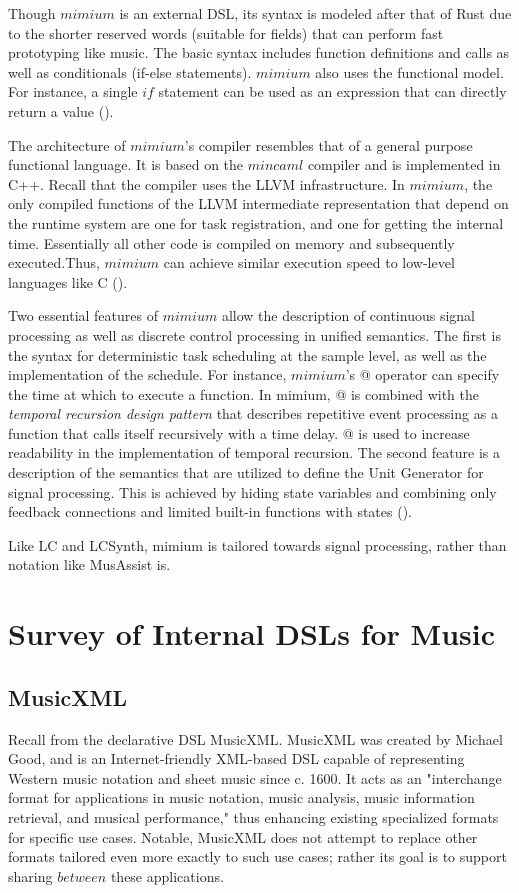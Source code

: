 \documentclass{report}
\newcommand\citeparen[1]{(\cite{#1})}
\begin{document}
Though $mimium$ is an external DSL, its syntax  is modeled  after that of  Rust  due  to  the shorter reserved words (suitable for fields) that can perform fast prototyping  like  music. The  basic syntax  includes function definitions and calls as well as  conditionals (if-else statements). $mimium$ also uses the functional model. For instance, a single  $if$ statement can be  used as an expression that can  directly  return  a value \citeparen{matsuura_jo_2021}.

The architecture of  $mimium$'s  compiler resembles that of a general purpose  functional language. It is based  on the $mincaml$ compiler and  is  implemented  in C++. Recall  that the  compiler uses the LLVM infrastructure. In $mimium$, the only compiled functions of the LLVM intermediate representation that depend on  the runtime system are one for task registration, and one for getting the internal time. Essentially all other code is compiled  on memory and subsequently  executed.Thus,  $mimium$ can achieve similar execution speed to low-level  languages  like C \citeparen{matsuura_jo_2021}.

Two essential features of $mimium$  allow the description of continuous  signal processing as well as discrete control processing in unified semantics. The first is the syntax for deterministic task scheduling  at the sample level, as well as  the implementation of the schedule. For instance, $mimium$'s  @ operator  can specify the time at which to execute a  function. In mimium, @ is combined with the \textit{temporal recursion design pattern} that describes repetitive event processing as a function that calls itself recursively with a time delay. @ is used to increase readability in the implementation of temporal recursion.  The second feature is a  description of the semantics that are utilized to define the Unit Generator for signal processing.  This is achieved  by hiding state  variables   and   combining only feedback connections  and limited built-in functions  with states \citeparen{matsuura_jo_2021}.

Like LC and LCSynth, mimium is tailored towards signal processing, rather than notation like MusAssist is.

\section{Survey of Internal DSLs for Music}
\label{sec:internal}

\subsection{MusicXML}
Recall from  the declarative DSL MusicXML. MusicXML was created by Michael Good, and is an Internet-friendly XML-based DSL capable of representing Western music notation and sheet music since c. 1600. It acts as an "interchange format for applications in music notation, music analysis, music information retrieval, and musical performance," thus enhancing existing specialized formats for specific use cases. Notable, MusicXML does not attempt to replace other formats tailored even more exactly to such use cases; rather its goal is to support sharing $between$ these applications. \cite{good_2013}
\end{document}
